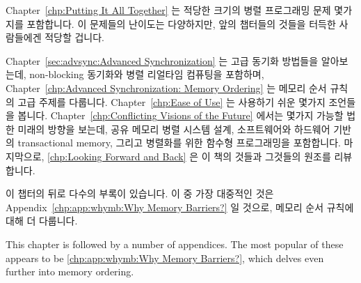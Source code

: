 \fi

Chapter~\ref{chp:Putting It All Together}
는 적당한 크기의 병렬 프로그래밍 문제 몇가지를 포함합니다.
이 문제들의 난이도는 다양하지만, 앞의 챕터들의 것들을 터득한 사람들에겐 적당할
겁니다.

Chapter~\ref{sec:advsync:Advanced Synchronization}
는 고급 동기화 방법들을 알아보는데, non-blocking 동기화와 병렬 리얼타임
컴퓨팅을 포함하며,
Chapter~\ref{chp:Advanced Synchronization: Memory Ordering} 는 메모리 순서
규칙의 고급 주제를 다룹니다.
Chapter~\ref{chp:Ease of Use} 는 사용하기 쉬운 몇가지 조언들을 봅니다.
Chapter~\ref{chp:Conflicting Visions of the Future}
에서는 몇가지 가능할 법한 미래의 방향을 보는데, 공유 메모리 병렬 시스템 설계,
소프트웨어와 하드웨어 기반의 transactional memory, 그리고 병렬화를 위한 함수형
프로그래밍을 포함합니다.
마지막으로, \cref{chp:Looking Forward and Back} 은 이 책의 것들과 그것들의
원조를 리뷰합니다.

\iffalse

\Cref{chp:Putting It All Together}
contains a series of moderate-sized parallel programming problems.
The difficulty of these problems vary, but should be appropriate for
someone who has mastered the material in the previous chapters.

\Cref{sec:advsync:Advanced Synchronization}
looks at advanced synchronization methods, including
non-blocking synchronization and parallel real-time computing,
while \cref{chp:Advanced Synchronization: Memory Ordering}
covers the advanced topic of memory ordering.
\Cref{chp:Ease of Use} follows up with some ease-of-use advice.
\Cref{chp:Conflicting Visions of the Future}
looks at a few possible future directions, including
shared-memory parallel system design, software and hardware transactional
memory, and functional programming for parallelism.
Finally, \cref{chp:Looking Forward and Back} reviews the material in
this book and its origins.

\fi

이 챕터의 뒤로 다수의 부록이 있습니다.
이 중 가장 대중적인 것은 Appendix~\ref{chp:app:whymb:Why Memory Barriers?} 일
것으로, 메모리 순서 규칙에 대해 더 다룹니다.

\iffalse

This chapter is followed by a number of appendices.
The most popular of these appears to be
\cref{chp:app:whymb:Why Memory Barriers?},
which delves even further into memory ordering.

